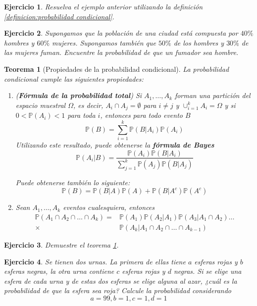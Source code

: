 \documentclass[11pt]{report}
\theoremstyle{break}
\newtheorem{teorema}{Teorema}[chapter]
\newtheorem{ejercicio}{Ejercicio}[chapter]
\theoremstyle{break}
\begin{document}
\begin{ejercicio}
Resuelva el ejemplo anterior utilizando la definición \ref{definicion:probabilidad condicional}.
\end{ejercicio}

\begin{ejercicio}
Supongamos que la población de una ciudad está compuesta por $40\%$ hombres y $60\%$ mujeres. Supongamos también que $50\%$ de los hombres y $30\%$ de las mujeres fuman. Encuentre la probabilidad de que un fumador sea hombre.
\end{ejercicio}

\begin{teorema}[Propiedades de la probabilidad condicional]
\label{teorema:propiedades probabilidad condicional}
La probabilidad condicional cumple las siguientes propiedades:
\begin{enumerate}[label=\alph*)]
\item (\textbf{Fórmula de la probabilidad total}) Si $A_1, \ldots, A_k$ forman una partición del espacio muestral $\Omega$, es decir, $A_i \cap A_j = \emptyset$ para $i \neq j$ y $\cup_{i=1}^{k}A_i = \Omega$ y si $0 < \mathbb{P}(A_i) < 1$ para toda $i$, entonces para todo evento $B$
$$
\mathbb{P}(B) = \sum_{i=1}^{k}\mathbb{P}(B|A_i)\mathbb{P}(A_i)
$$
Utilizando este resultado, puede obtenerse la \textbf{fórmula de Bayes}
$$
\mathbb{P}(A_i|B) = \dfrac{\mathbb{P}(A_i) \mathbb{P}(B|A_i) }{\sum_{j=1}^{k} \mathbb{P}(A_j) \mathbb{P}(B|A_j)}
$$

Puede obtenerse también lo siguiente:
$$
\mathbb{P}(B) = \mathbb{P}(B|A)\mathbb{P}(A) + \mathbb{P}(B|A^c)\mathbb{P}(A^c)
$$

\item Sean $A_1, \ldots, A_k$ eventos cualesquiera, entonces
\begin{align*}
\mathbb{P}(A_1 \cap A_2 \cap \ldots \cap A_k)  = & \mathbb{P}(A_1)\mathbb{P}(A_2|A_1)\mathbb{P}(A_3|A_1 \cap A_2)\ldots \\
 \times & \mathbb{P}(A_k|A_1 \cap A_2 \cap \ldots \cap A_{k-1})
\end{align*}
\end{enumerate}
\end{teorema}
\begin{ejercicio}
Demuestre el teorema \ref{teorema:propiedades probabilidad condicional}.
\end{ejercicio}

\begin{ejercicio}
Se tienen dos urnas. La primera de ellas tiene $a$ esferas rojas y $b$ esferas negras, la otra urna contiene $c$ esferas rojas y $d$ negras.
Si se elige una esfera de cada urna y de estas dos esferas se elige alguna al azar, ¿cuál es la probabilidad de que la esfera sea roja?
Calcule la probabilidad considerando
$$
a = 99, b = 1, c = 1, d = 1
$$
\end{ejercicio}
\end{document}
